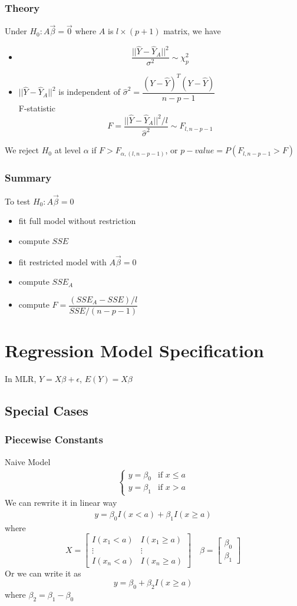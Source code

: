 \documentclass[11pt]{article}
\newcommand{\cv}[1]{\begin{bmatrix} #1 \end{bmatrix}}
\begin{document}
\subsubsection*{Theory}
Under $H_0:A\vec{\beta}=\vec{0}$ where $A$ is $l\times(p+1)$ matrix, we have
\begin{itemize}
    \item \[\frac{||\hat{Y}-\hat{Y}_A||^2}{\sigma^2}\sim \chi^2_p\]
    \item $||\hat{Y}-\hat{Y}_A||^2$ is independent of $\hat{\sigma}^2 = \dfrac{(Y-\hat{Y})^T(Y-\hat{Y})}{n-p-1}$ \\
    F-statistic \[F=\frac{||\hat{Y}-\hat{Y}_A||^2/l}{\hat{\sigma}^2}\sim F_{l,n-p-1}\]
\end{itemize}
We reject $H_0$ at level $\alpha$ if $F>F_{\alpha,(l,n-p-1)}$, or $p-value = P(F_{l,n-p-1}>F)$
\subsubsection{Summary}
To test $H_0:A\vec{\beta}=0$
\begin{itemize}
    \item fit full model without restriction 
    \item compute $SSE$
    \item fit restricted model with $A\vec{\beta}=0$
    \item compute $SSE_A$
    \item compute $F=\dfrac{(SSE_A-SSE)/l}{SSE/(n-p-1)}$
\end{itemize}

\section{Regression Model Specification}
In MLR, $Y=X\beta+\epsilon$, $E(Y)=X\beta$
\subsection{Special Cases}
\subsubsection{Piecewise Constants}
Naive Model 
\begin{align*}
    \begin{cases}
        y = \beta_0 &\text{if } x\leq a \\
        y = \beta_1 &\text{if } x>a
    \end{cases}
\end{align*}
We can rewrite it in linear way 
\begin{align*}
    y = \beta_0I(x<a) + \beta_1I(x\geq a)
\end{align*}
where \[X = \cv{I(x_1<a) &I(x_1\geq a) \\\vdots &\vdots \\I(x_n<a) &I(x_n\geq a)}\quad \beta = \cv{\beta_0 \\\beta_1}\]
Or we can write it as 
\[y = \beta_0 + \beta_2I(x\geq a)\]
where $\beta_2 = \beta_1 - \beta_0$
\end{document}
